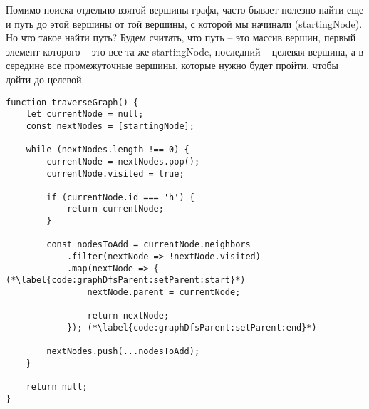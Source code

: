 \documentclass[../../article.tex]{subfiles}
\begin{document}
Помимо поиска отдельно взятой вершины графа, часто бывает полезно найти еще и путь до этой вершины от той вершины, с которой мы начинали ({\firacodebold startingNode}). Но что такое найти путь? Будем считать, что путь – это массив вершин, первый элемент которого – это все та же {\firacodebold startingNode}, последний – целевая вершина, а в середине все промежуточные вершины, которые нужно будет пройти, чтобы дойти до целевой.

\begin{figure*}
    \begin{ruledelement}
        \begin{lstlisting}[caption={Обход графа в глубину и формирование обратного дерева обхода}, label={lst:graphDfsParent}]
function traverseGraph() {
    let currentNode = null;
    const nextNodes = [startingNode];

    while (nextNodes.length !== 0) {
        currentNode = nextNodes.pop();
        currentNode.visited = true;

        if (currentNode.id === 'h') {
            return currentNode;
        }

        const nodesToAdd = currentNode.neighbors
            .filter(nextNode => !nextNode.visited)
            .map(nextNode => { (*\label{code:graphDfsParent:setParent:start}*)
                nextNode.parent = currentNode;

                return nextNode;
            }); (*\label{code:graphDfsParent:setParent:end}*)

        nextNodes.push(...nodesToAdd);
    }

    return null;
}
        \end{lstlisting}
    \end{ruledelement}

\end{figure*}
\end{document}

